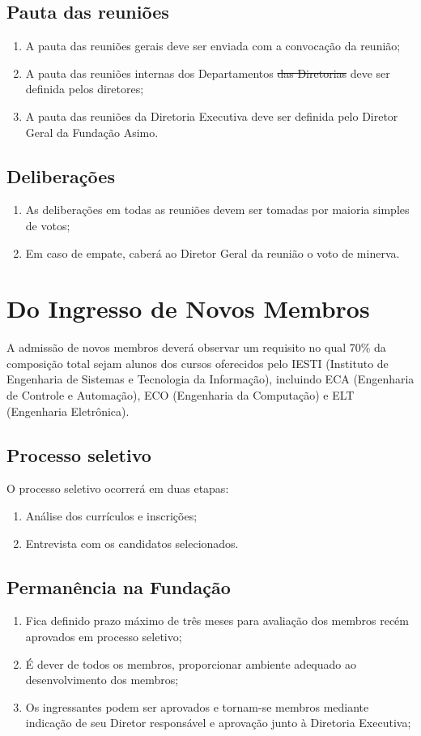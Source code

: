     \subsection{Pauta das reuniões}
    \begin{enumerate}
        \item A pauta das reuniões gerais deve ser enviada com a convocação da reunião;
        \item A pauta das reuniões internas {\color{red}dos Departamentos} {\color{cyan}\sout {das Diretorias}} deve ser definida pelos diretores;
        \item A pauta das reuniões da Diretoria Executiva deve ser definida pelo Diretor Geral da Fundação Asimo.
    \end{enumerate}
    \subsection{Deliberações}
    \begin{enumerate}
        \item As deliberações em todas as reuniões devem ser tomadas por maioria simples de votos;
        \item Em caso de empate, caberá ao Diretor Geral da reunião o voto de minerva.
    \end{enumerate}

\section{Do Ingresso de Novos Membros}
   {\color{red} A admissão de novos membros deverá observar um requisito no qual 70$\%$ da composição total sejam alunos dos cursos oferecidos pelo IESTI (Instituto de Engenharia de Sistemas e Tecnologia da Informação), incluindo ECA (Engenharia de Controle e Automação), ECO (Engenharia da Computação) e ELT (Engenharia Eletrônica).}
    \subsection{Processo seletivo}
    O processo seletivo ocorrerá em duas etapas:
    \begin{enumerate}
        \item Análise dos currículos e inscrições;
        \item Entrevista com os candidatos selecionados.
    \end{enumerate}
    \subsection{Permanência na Fundação}
    \begin{enumerate}
        \item Fica definido prazo máximo de três meses para avaliação dos membros recém aprovados em processo seletivo;
        \item É dever de todos os membros, proporcionar ambiente adequado ao desenvolvimento dos membros;
        \item Os ingressantes podem ser aprovados e tornam-se membros mediante indicação de seu Diretor responsável e aprovação junto à Diretoria Executiva;    
    \end{enumerate}

